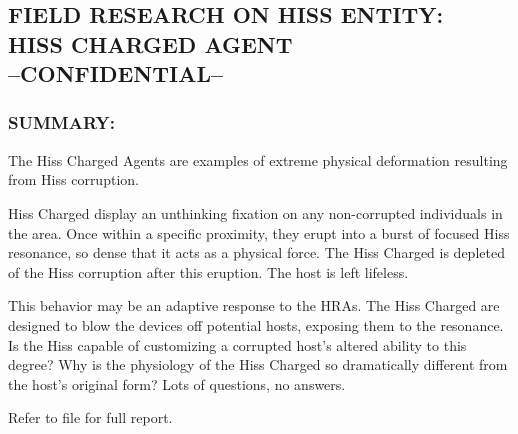 \subsection*{FIELD RESEARCH ON HISS ENTITY:\\HISS CHARGED AGENT\\--CONFIDENTIAL--}
\subsubsection*{SUMMARY:}
\par The Hiss Charged Agents are examples
of extreme physical deformation resulting
from Hiss corruption.
\par Hiss Charged display an unthinking
fixation on any non-corrupted individuals
in the area. Once within a specific proximity, they erupt into a
burst of focused Hiss resonance, so dense that it acts as a
physical force. The Hiss Charged is depleted of the Hiss
corruption after this eruption. The host is left lifeless.
\par This behavior may be an adaptive response to the HRAs. The Hiss
Charged are designed to blow the devices off potential hosts,
exposing them to the resonance. Is the Hiss capable of
customizing a corrupted host's altered ability to this degree? Why
is the physiology of the Hiss Charged so dramatically different
from the host's original form? Lots of questions, no answers.
\par Refer to file for full report.
